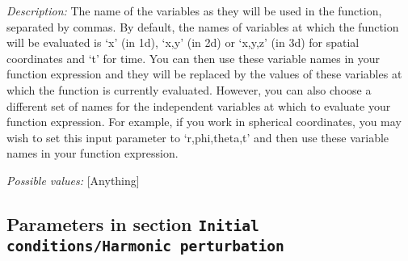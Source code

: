 \begin{itemize}
{\it Description:} The name of the variables as they will be used in the function, separated by commas. By default, the names of variables at which the function will be evaluated is `x' (in 1d), `x,y' (in 2d) or `x,y,z' (in 3d) for spatial coordinates and `t' for time. You can then use these variable names in your function expression and they will be replaced by the values of these variables at which the function is currently evaluated. However, you can also choose a different set of names for the independent variables at which to evaluate your function expression. For example, if you work in spherical coordinates, you may wish to set this input parameter to `r,phi,theta,t' and then use these variable names in your function expression.


{\it Possible values:} [Anything]
\end{itemize}

\subsection{Parameters in section \tt Initial conditions/Harmonic perturbation}
\label{parameters:Initial_20conditions/Harmonic_20perturbation}

